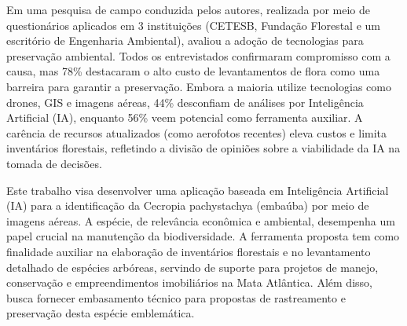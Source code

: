 Em uma pesquisa de campo conduzida pelos autores, realizada por meio de questionários aplicados em 3 instituições (CETESB, Fundação Florestal e um escritório de Engenharia Ambiental), avaliou a adoção de tecnologias para preservação ambiental. Todos os entrevistados confirmaram compromisso com a causa, mas 78\% destacaram o alto custo de levantamentos de flora como uma barreira para garantir a preservação. Embora a maioria utilize tecnologias como drones, GIS e imagens aéreas, 44\% desconfiam de análises por Inteligência Artificial (IA), enquanto 56\% veem potencial como ferramenta auxiliar. A carência de recursos atualizados (como aerofotos recentes) eleva custos e limita inventários florestais, refletindo a divisão de opiniões sobre a viabilidade da IA na tomada de decisões.

Este trabalho visa desenvolver uma aplicação baseada em Inteligência Artificial (IA) para a identificação da Cecropia pachystachya (embaúba) por meio de imagens aéreas. A espécie, de relevância econômica e ambiental, desempenha um papel crucial na manutenção da biodiversidade. A ferramenta proposta tem como finalidade auxiliar na elaboração de inventários florestais e no levantamento detalhado de espécies arbóreas, servindo de suporte para projetos de manejo, conservação e empreendimentos imobiliários na Mata Atlântica. Além disso, busca fornecer embasamento técnico para propostas de rastreamento e preservação desta espécie emblemática.